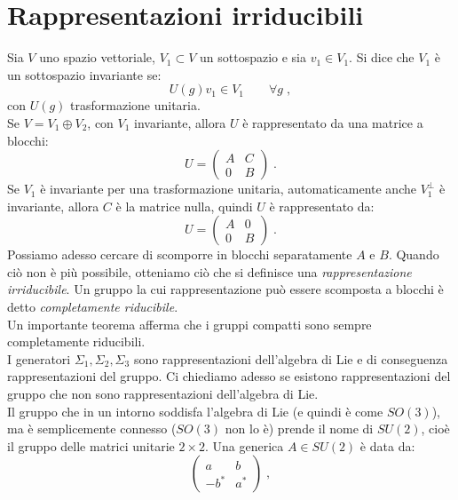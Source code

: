 \documentclass[12pt,a4paper]{report}
\theoremstyle{definition}
\numberwithin{equation}{section}
\begin{document}
\section{Rappresentazioni irriducibili}
Sia $V$ uno spazio vettoriale, $V_1\subset V$ un sottospazio e sia $v_1\in V_1$. Si dice che $V_1$ è un sottospazio invariante se:
\begin{equation}
U(g)v_1\in V_1 \qquad \forall g\;,
\end{equation}
con $U(g)$ trasformazione unitaria. \\
Se $V=V_1\oplus V_2$, con $V_1$ invariante, allora $U$ è rappresentato da una matrice a blocchi:
\begin{equation}
U=\left(\begin{matrix}
A & C \\
0 & B
\end{matrix}\right)\;.
\end{equation}
Se $V_1$ è invariante per una trasformazione unitaria, automaticamente anche $V_1^{\perp}$ è invariante, allora $C$ è la matrice nulla, quindi $U$ è rappresentato da:
\begin{equation}
U=\left(
\begin{matrix}
A & 0 \\
0 & B
\end{matrix}\right)\;.
\end{equation}
Possiamo adesso cercare di scomporre in blocchi separatamente $A$ e $B$. Quando ciò non è più possibile, otteniamo ciò che si definisce una \textit{rappresentazione irriducibile}. Un gruppo la cui rappresentazione può essere scomposta a blocchi è detto \textit{completamente riducibile}. \\
Un importante teorema afferma che i gruppi compatti sono sempre completamente riducibili. \\
I generatori $\Sigma_1,\Sigma_2,\Sigma_3$ sono rappresentazioni dell'algebra di Lie e di conseguenza rappresentazioni del gruppo. Ci chiediamo adesso se esistono rappresentazioni del gruppo che non sono rappresentazioni dell'algebra di Lie. \\
Il gruppo che in un intorno soddisfa l'algebra di Lie (e quindi è come $SO(3)$), ma è semplicemente connesso ($SO(3)$ non lo è) prende il nome di $SU(2)$, cioè il gruppo delle matrici unitarie $2\times 2$. Una generica $A\in SU(2)$ è data da:
\begin{equation}
\left(\begin{matrix}
a & b \\
-b^* & a^*
\end{matrix}\right)\;,
\end{equation}
\end{document}

